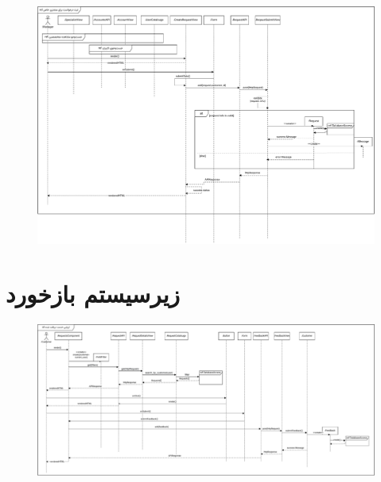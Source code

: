 \begin{figure}[ht!]
	\centering
	\includegraphics[scale=0.8]{figs/design-sequence/3-23.pdf}
\end{figure}
\FloatBarrier
\newpage


\eject \pdfpagewidth=13in \pdfpageheight=10in

\section{زیرسیستم بازخورد}

\eject \pdfpagewidth=17in \pdfpageheight=8in

\begin{figure}[ht!]
	\centering
	\includegraphics[scale=0.8]{figs/design-sequence/3-24.pdf}
\end{figure}
\FloatBarrier
\newpage

\eject \pdfpagewidth=17in \pdfpageheight=8in


